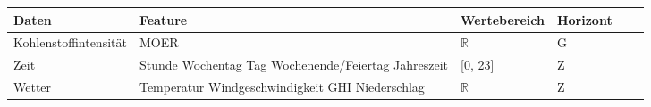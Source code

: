 \begin{tabularx}{\textwidth}{|X|X|X|X|X|X|}
    \hline
    Daten & Feature & Wertebereich & Horizont\tnote{a} \\ \hline \hline
    Kohlenstoffintensität & MOER & $\mathbb{R}$ & G \\ \hline
    Zeit & Stunde \newline Wochentag \newline Tag \newline Wochenende/Feiertag \newline Jahreszeit & [0, 23] \newline [0, 6] \newline [1, 365] \newline [0, 1] \newline [0, 3] & Z \\ \hline
    Wetter & Temperatur \newline Windgeschwindigkeit \newline GHI \newline Niederschlag & $\mathbb{R}$ & Z\\ \hline
\end{tabularx}


